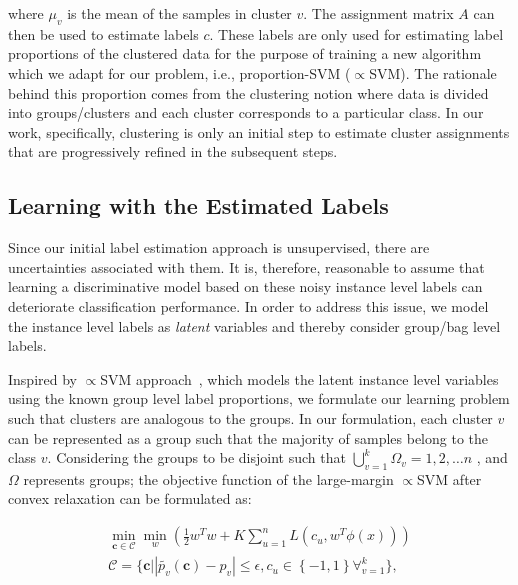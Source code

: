\documentclass[journal]{IEEEtran}
\DeclareMathOperator*{\minimum}{min}
\begin{document}
\noindent where $\mu_v$ is the mean of the samples in cluster $v$. The assignment matrix $A$ can then be used to estimate labels $c$. These labels are only used for estimating label proportions of the clustered data for the purpose of training a new algorithm which we adapt for our problem, i.e., proportion-SVM ($\propto$SVM). The rationale behind this proportion comes from the clustering notion where data is divided into groups/clusters and each cluster corresponds to a particular class. In our work, specifically, clustering is only an initial step to estimate cluster assignments that are progressively refined in the subsequent steps.%

\subsection{Learning with the Estimated Labels}

Since our initial label estimation approach is unsupervised, there are uncertainties associated with them. It is, therefore, reasonable to assume that learning a discriminative model based on these noisy instance level labels can deteriorate classification performance. In order to address this issue, we model the instance level labels as \textit{latent} variables and thereby consider group/bag level labels.

Inspired by $\propto$SVM approach~\cite{yu2013propto}, which models the latent instance level variables using the known group level label proportions, we formulate our learning problem such that clusters are analogous to the groups. In our formulation, each cluster $v$ can be represented as a group such that the majority of samples belong to the class $v$. Considering the groups to be disjoint such that $\bigcup_{v=1}^{k}$\textbf{$\Omega_v$}$={1,2,\dots n}$ , and $\Omega$ represents groups; the objective function of the large-margin $\propto$SVM after convex relaxation can be formulated as:

\begin{equation}
\begin{split}
\minimum_{\mathbf{c} \in \mathcal{C}} \minimum_{w} \left(\frac{1}{2}w^Tw+K\sum_{u=1}^{n}L(c_u,w^T\phi(x))\right)\\
\mathcal{C}=\biggl\{ \mathbf{c} \bigg| \left | \widetilde{p_v}(\mathbf{c})-p_v \right | \leq \epsilon ,c_u \in \left \{ -1,1 \right \} \forall_{v=1}^{k} \biggr\},
\end{split}
\label{eq:propsvm}
\end{equation}
\end{document}
